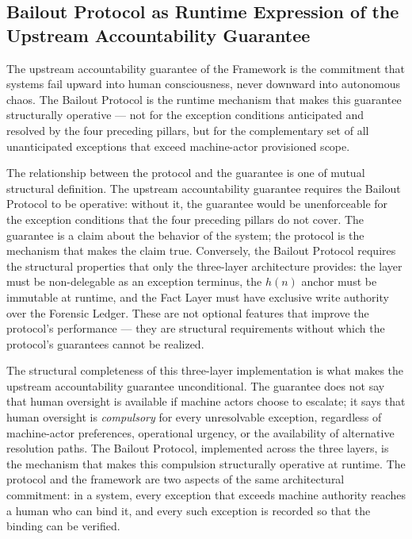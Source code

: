 \subsection{Bailout Protocol as Runtime Expression of the Upstream Accountability Guarantee}
\label{sec:runtime-expression}

The upstream accountability guarantee of the \bxthree{} Framework is the commitment that \bxthree{} systems fail upward into human consciousness, never downward into autonomous chaos. The Bailout Protocol is the runtime mechanism that makes this guarantee structurally operative --- not for the exception conditions anticipated and resolved by the four preceding pillars, but for the complementary set of all unanticipated exceptions that exceed machine-actor provisioned scope.

The relationship between the protocol and the guarantee is one of mutual structural definition. The upstream accountability guarantee requires the Bailout Protocol to be operative: without it, the guarantee would be unenforceable for the exception conditions that the four preceding pillars do not cover. The guarantee is a claim about the behavior of the system; the protocol is the mechanism that makes the claim true. Conversely, the Bailout Protocol requires the structural properties that only the \bxthree{} three-layer architecture provides: the \purpose{} layer must be non-delegable as an exception terminus, the $h(n)$ anchor must be immutable at runtime, and the Fact Layer must have exclusive write authority over the Forensic Ledger. These are not optional features that improve the protocol's performance --- they are structural requirements without which the protocol's guarantees cannot be realized.

The structural completeness of this three-layer implementation is what makes the upstream accountability guarantee unconditional. The guarantee does not say that human oversight is available if machine actors choose to escalate; it says that human oversight is \emph{compulsory} for every unresolvable exception, regardless of machine-actor preferences, operational urgency, or the availability of alternative resolution paths. The Bailout Protocol, implemented across the three \bxthree{} layers, is the mechanism that makes this compulsion structurally operative at runtime. The protocol and the framework are two aspects of the same architectural commitment: in a \bxthree{} system, every exception that exceeds machine authority reaches a human who can bind it, and every such exception is recorded so that the binding can be verified.

